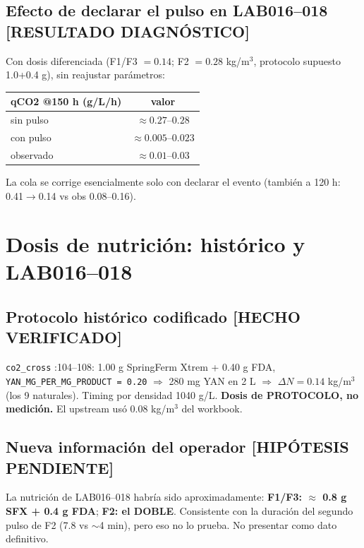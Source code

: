 \documentclass[11pt,a4paper]{article}
\newcommand{\code}[1]{\nolinkurl{#1}}
\newcommand{\hecho}{\textcolor{hecho}{\textbf{[HECHO VERIFICADO]}}}
\newcommand{\diag}{\textcolor{diagc}{\textbf{[RESULTADO DIAGN\'OSTICO]}}}
\newcommand{\hipo}{\textcolor{hipo}{\textbf{[HIP\'OTESIS PENDIENTE]}}}
\newcommand{\ruta}[1]{\texttt{\small #1}}
\begin{document}
\subsection{Efecto de declarar el pulso en LAB016--018 \diag}
Con dosis diferenciada (F1/F3 $=0.14$; F2 $=0.28$ kg/m$^3$, protocolo supuesto 1.0+0.4 g), sin reajustar par\'ametros:

\begin{center}
\begin{tabular}{lc}
\toprule
qCO2 @150 h (g/L/h) & valor \\
\midrule
sin pulso & $\approx 0.27$--$0.28$ \\
con pulso & $\approx 0.005$--$0.023$ \\
observado & $\approx 0.01$--$0.03$ \\
\bottomrule
\end{tabular}
\end{center}

La cola se corrige esencialmente solo con declarar el evento (tambi\'en a 120 h: 0.41$\to$0.14 vs obs 0.08--0.16).

\section{Dosis de nutrici\'on: hist\'orico y LAB016--018}

\subsection{Protocolo hist\'orico codificado \hecho}
\ruta{co2\_cross} :104--108: 1.00 g SpringFerm Xtrem + 0.40 g FDA, \code{YAN_MG_PER_MG_PRODUCT = 0.20} $\Rightarrow$ 280 mg YAN en 2 L $\Rightarrow$ $\Delta N = 0.14$ kg/m$^3$ (los 9 naturales). Timing por densidad 1040 g/L. \textbf{Dosis de PROTOCOLO, no medici\'on.} El upstream us\'o 0.08 kg/m$^3$ del workbook.

\subsection{Nueva informaci\'on del operador \hipo}
La nutrici\'on de LAB016--018 habr\'ia sido aproximadamente: \textbf{F1/F3: $\approx$ 0.8 g SFX + 0.4 g FDA}; \textbf{F2: el DOBLE}. Consistente con la duraci\'on del segundo pulso de F2 (7.8 vs ${\sim}$4 min), pero eso no lo prueba. No presentar como dato definitivo.
\end{document}
